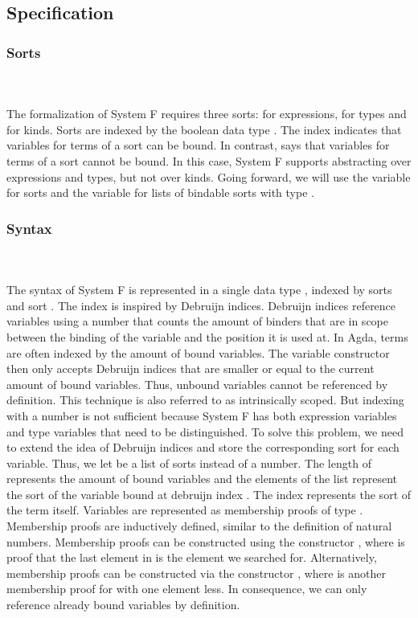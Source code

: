 \subsection{Specification}
\subsubsection{Sorts}\hfill\\\\
The formalization of System F requires three sorts:  for expressions,  for types and  for kinds. 
\FSort
Sorts are indexed by the boolean data type . 
The index  indicates that variables for terms of a sort can be bound. 
In contrast,  says that variables for terms of a sort cannot be bound. 
In this case, System F supports abstracting over expressions and types, but not over kinds. 
Going forward, we will use the variable  for sorts and the variable  for lists of bindable sorts with type \FSorts.

\subsubsection{Syntax}\hfill\\\\
The syntax of System F is represented in a single data type , indexed by sorts  and sort . 
The index  is inspired by Debruijn indices. Debruijn indices reference variables using a number that counts the amount of binders that are in scope between the binding of the variable and the position it is used at.
In Agda, terms are often indexed by the amount of bound variables. The variable constructor then only accepts Debruijn indices that are smaller or equal to the current amount of bound variables.
Thus, unbound variables cannot be referenced by definition. This technique is also referred to as intrinsically scoped.
But indexing  with a number is not sufficient because System F has both expression variables and type variables that need to be distinguished. 
To solve this problem, we need to extend the idea of Debruijn indices and store the corresponding sort for each variable. Thus, we let  be a list of sorts instead of a number.
The length of  represents the amount of bound variables and the elements  of the list represent the sort of the variable bound at debruijn index . 
The index  represents the sort of the term itself.
\FTerm
Variables   are represented as membership proofs of type   .
Membership proofs are inductively defined, similar to the definition of natural numbers. 
Membership proofs can be constructed using the constructor , where  is proof that the last element in  is the element we searched for. 
Alternatively, membership proofs can be constructed via the constructor  , where  is another membership proof for  with one element less. 
In consequence, we can only reference already bound variables by definition. 

